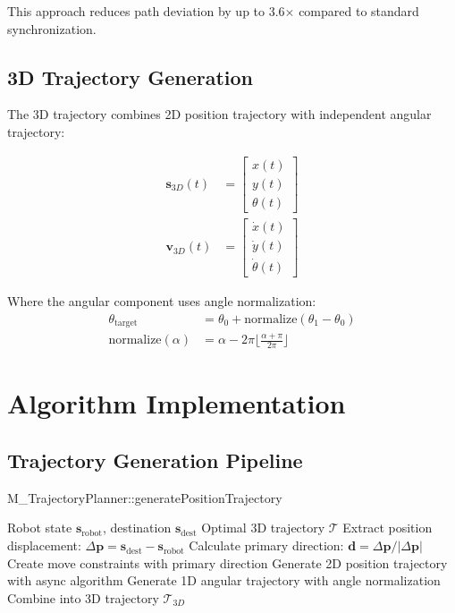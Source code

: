 \documentclass[12pt,a4paper]{article}
\begin{document}
This approach reduces path deviation by up to 3.6× compared to standard synchronization.

\subsection{3D Trajectory Generation}

The 3D trajectory combines 2D position trajectory with independent angular trajectory:

\begin{align}
\mathbf{s}_{3D}(t) &= \begin{bmatrix} x(t) \\ y(t) \\ \theta(t) \end{bmatrix} \\
\mathbf{v}_{3D}(t) &= \begin{bmatrix} \dot{x}(t) \\ \dot{y}(t) \\ \dot{\theta}(t) \end{bmatrix}
\end{align}

Where the angular component uses angle normalization:
\begin{align}
\theta_{\text{target}} &= \theta_0 + \text{normalize}(\theta_1 - \theta_0) \\
\text{normalize}(\alpha) &= \alpha - 2\pi \lfloor \frac{\alpha + \pi}{2\pi} \rfloor
\end{align}

\section{Algorithm Implementation}

\subsection{Trajectory Generation Pipeline}

\begin{algorithm}
\caption{M\_TrajectoryPlanner::generatePositionTrajectory}
\begin{algorithmic}[1]
\REQUIRE Robot state $\mathbf{s}_{\text{robot}}$, destination $\mathbf{s}_{\text{dest}}$
\ENSURE Optimal 3D trajectory $\mathcal{T}$
\STATE Extract position displacement: $\Delta\mathbf{p} = \mathbf{s}_{\text{dest}} - \mathbf{s}_{\text{robot}}$
\STATE Calculate primary direction: $\mathbf{d} = \Delta\mathbf{p} / |\Delta\mathbf{p}|$
\STATE Create move constraints with primary direction
\STATE Generate 2D position trajectory with async algorithm
\STATE Generate 1D angular trajectory with angle normalization
\STATE Combine into 3D trajectory
\RETURN $\mathcal{T}_{3D}$
\end{algorithmic}
\end{algorithm}
\end{document}
